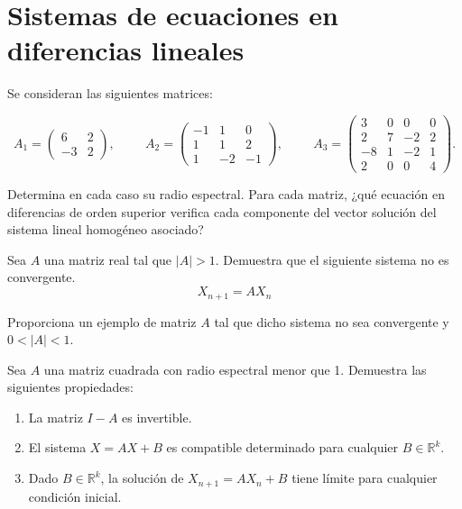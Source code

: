 \section{Sistemas de ecuaciones en diferencias lineales}

\begin{ejercicio}
Se consideran las siguientes matrices:

\begin{equation*}
    A_1 =
    \begin{pmatrix}
    6 & 2\\
    -3 & 2
    \end{pmatrix}
    , \hspace{1cm}
    A_2=
    \begin{pmatrix}
    -1 & 1 & 0\\
    1 & 1 & 2\\
    1 & -2 & -1
    \end{pmatrix}
    , \hspace{1cm}
    A_3=\begin{pmatrix}
    3 & 0 & 0 & 0\\
    2 & 7 & -2 & 2\\
    -8 & 1 & -2 & 1\\
    2 & 0 & 0 & 4
    \end{pmatrix}.
\end{equation*}

Determina en cada caso su radio espectral. Para cada matriz, ¿qué ecuación en diferencias de orden superior verifica cada componente del vector solución del sistema lineal homogéneo asociado?
\end{ejercicio}

\begin{ejercicio}
    Sea $A$ una matriz real tal que $|A| > 1$. Demuestra que el siguiente sistema no es convergente.
    \begin{equation*}
    X_{n+1} = AX_n
    \end{equation*}
    
    Proporciona un ejemplo de matriz $A$ tal que dicho sistema no sea convergente y $0 < |A| < 1$.
\end{ejercicio}

\begin{ejercicio}
Sea $A$ una matriz cuadrada con radio espectral menor que 1. Demuestra las siguientes propiedades:

\begin{enumerate}
    \item La matriz $I - A$ es invertible.
    \item El sistema $X = AX + B$ es compatible determinado para cualquier $B \in \mathbb{R}^k$.
    \item Dado $B \in \mathbb{R}^k$, la solución de $X_{n+1} = AX_n + B$ tiene límite para cualquier condición inicial.
\end{enumerate}
\end{ejercicio}

